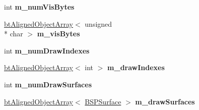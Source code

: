 \begin{DoxyCompactItemize}
\item 
\hypertarget{class_bsp_loader_a2dfafa5ce1505ada92fc1a955788ef73}{int {\bfseries m\+\_\+num\+Vis\+Bytes}}\label{class_bsp_loader_a2dfafa5ce1505ada92fc1a955788ef73}

\item 
\hypertarget{class_bsp_loader_a91977677d6c22be8072230daf25882b5}{\hyperlink{classbt_aligned_object_array}{bt\+Aligned\+Object\+Array}$<$ unsigned \\*
char $>$ {\bfseries m\+\_\+vis\+Bytes}}\label{class_bsp_loader_a91977677d6c22be8072230daf25882b5}

\item 
\hypertarget{class_bsp_loader_a4b82599534cfeda9c23f61a35c8db66e}{int {\bfseries m\+\_\+num\+Draw\+Indexes}}\label{class_bsp_loader_a4b82599534cfeda9c23f61a35c8db66e}

\item 
\hypertarget{class_bsp_loader_a5d0d06bc7e087d7d060aa96fca548ab3}{\hyperlink{classbt_aligned_object_array}{bt\+Aligned\+Object\+Array}$<$ int $>$ {\bfseries m\+\_\+draw\+Indexes}}\label{class_bsp_loader_a5d0d06bc7e087d7d060aa96fca548ab3}

\item 
\hypertarget{class_bsp_loader_af94cb824dd240df87a90c3023ca367ca}{int {\bfseries m\+\_\+num\+Draw\+Surfaces}}\label{class_bsp_loader_af94cb824dd240df87a90c3023ca367ca}

\item 
\hypertarget{class_bsp_loader_a2fe3f6d6cdaf25ee6a66d52a35dabd75}{\hyperlink{classbt_aligned_object_array}{bt\+Aligned\+Object\+Array}$<$ \hyperlink{struct_b_s_p_surface}{B\+S\+P\+Surface} $>$ {\bfseries m\+\_\+draw\+Surfaces}}\label{class_bsp_loader_a2fe3f6d6cdaf25ee6a66d52a35dabd75}

\end{DoxyCompactItemize}
